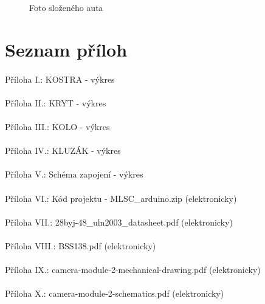 \documentclass[12pt]{article}
\begin{document}
\begin{spacing}{1.5}
\begin{figure}[H]
		\caption{Foto složeného auta}
		\label{fig:real_vse}
	\end{figure}
	
	\newpage
	\listoffigures
	
	\newpage
	\section*{Seznam příloh}
	\begin{spacing}{1}
		\paragraph{} Příloha I.: KOSTRA - výkres	
		\paragraph{} Příloha II.: KRYT - výkres	
		\paragraph{} Příloha III.: KOLO - výkres	
		\paragraph{} Příloha IV.: KLUZÁK - výkres	
		\paragraph{} Příloha V.: Schéma zapojení - výkres
		\paragraph{} Příloha VI.: Kód projektu - MLSC\_arduino.zip (elektronicky)
		\paragraph{} Příloha VII.: 28byj-48\_uln2003\_datasheet.pdf (elektronicky)
		\paragraph{} Příloha VIII.: BSS138.pdf (elektronicky)
		\paragraph{} Příloha IX.: camera-module-2-mechanical-drawing.pdf (elektronicky)
		\paragraph{} Příloha X.: camera-module-2-schematics.pdf (elektronicky)

\end{spacing}
\end{spacing}
\end{document}
